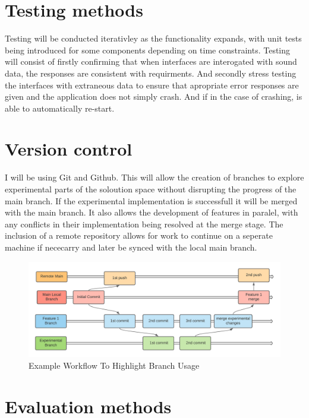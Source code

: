 \section{Testing methods}
  Testing will be conducted iterativley as the functionality expands, with unit tests being introduced for some components depending on time constraints. Testing will consist of firstly confirming that when interfaces are interogated with sound data, the responses are consistent with requirments. And secondly stress testing the interfaces with extraneous data to ensure that apropriate error responses are given and the application does not simply crash. And if in the case of crashing, is able to automatically re-start.

\section{Version control}
  I will be using Git and Github. This will allow the creation of branches to explore experimental parts of the soloution space without disrupting the progress of the main branch. If the experimental implementation is successfull it will be merged with the main branch. It also allows the development of features in paralel, with any conflicts in their implementation being resolved at the merge stage. The inclusion of a remote repository allows for work to continue on a seperate machine if nececarry and later be synced with the local main branch.
  \begin{figure}[H]
    \begin{center}
      \includegraphics[scale=0.7]{Images/Git_Workflow_Diagram}
      \caption{Example Workflow To Highlight Branch Usage}
      \label{fig:Git Workflow}
    \end{center}
  \end{figure}

\section{Evaluation methods}
